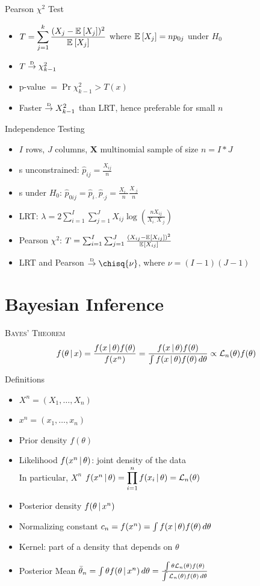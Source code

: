 \documentclass[landscape]{article}
\begin{document}
\begin{multicols*}{2}
Pearson $\chi^2$ Test
\begin{itemize}
  \item $T = \displaystyle \sum_{j=1}^k \frac{(X_j-\mathbb{E}_{}\left[X_j\right])^2}{\mathbb{E}_{}\left[X_j\right]}$
    where $\mathbb{E}_{}\left[X_j\right] = np_{0j}$ under $H_0$
  \item $T \stackrel{\text{\tiny{D}}}{\rightarrow} \chi_{k-1}^2$ 
  \item p-value $= \Pr{\chi_{k-1}^2 > T(x)}$
  \item Faster $\stackrel{\text{\tiny{D}}}{\rightarrow} X_{k-1}^2$ than LRT, hence preferable for small $n$
\end{itemize}

Independence Testing 
\begin{itemize}
  \item $I$ rows, $J$ columns, $\mathbf{X}$ multinomial sample of size $n=I*J$
  \item {\mle}s unconstrained: $\hat p_{ij} = \frac{X_{ij}}{n}$
  \item {\mle}s under $H_0$: $\hat p_{0ij} = \hat p_{i\cdot}\hat p_{\cdot j}
    = \frac{X_{i\cdot}}{n} \frac{X_{\cdot j}}{n}$
  \item LRT: $\lambda = 2\sum_{i=1}^I\sum_{j=1}^J X_{ij} 
    \log\left( \frac{nX_{ij}}{X_{i\cdot}X_{\cdot j}}\right)$
  \item Pearson $\chi^2$: $T = \sum_{i=1}^I\sum_{j=1}^J 
    \frac{(X_{ij}-\mathbb{E}_{}\left[X_{ij}\right])^2}{\mathbb{E}_{}\left[X_{ij}\right]}$
  \item LRT and Pearson $\dconv \chisq{\nu}$, where $\nu=(I-1)(J-1)$
\end{itemize}

\section{Bayesian Inference}

\textsc{Bayes' Theorem}
$$f(\theta\,|\, x) 
= \frac{f(x\,|\,\theta)f(\theta)}{f(x^n)}
= \frac{f(x\,|\,\theta)f(\theta)}
       {\int f(x\,|\,\theta)f(\theta)\,d\theta} \propto \mathcal{L}_n(\theta)f(\theta)$$

Definitions
\begin{itemize}
  \item $X^n = (X_1,\ldots,X_n)$
  \item $x^n = (x_1,\ldots,x_n)$
  \item Prior density $f(\theta)$
  \item Likelihood $f(x^n \,|\, \theta)$: joint density of the data\\ 
    In particular, $X^n$ \iid \imp $f(x^n\,|\,\theta) = 
    \displaystyle\prod_{i=1}^n f(x_i\,|\,\theta) = \mathcal{L}_n(\theta)$
  \item Posterior density $f(\theta\,|\, x^n)$
  \item Normalizing constant $c_n = f(x^n) 
    = \int f(x\,|\,\theta)f(\theta)\,d\theta$
  \item Kernel: part of a density that depends on $\theta$
  \item Posterior Mean $\bar\theta_n 
    = \int\theta f(\theta\,|\, x^n)\,d\theta
    = \frac{\int\theta\mathcal{L}_n(\theta)f(\theta)}
           {\int\mathcal{L}_n(\theta)f(\theta)\,d\theta}$
\end{itemize}


\end{multicols*}
\end{document}
